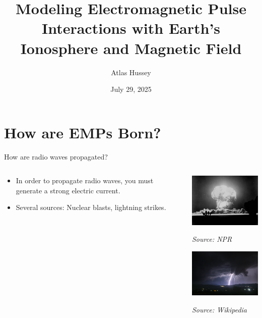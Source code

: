\documentclass[10pt, aspectratio=168]{beamer}
\title [EMP Analysis]{Modeling Electromagnetic Pulse Interactions with Earth's Ionosphere and Magnetic Field}
\author{Atlas Hussey}
\institute[]{ Institute for Computing in Research \\ Santa Fe, NM}
\date[07/29/2025]
{July 29, 2025}
\begin{document}
\frame{\titlepage}

\section{How are EMPs Born?}

    \begin{frame}{How are radio waves propagated?}
    \begin{columns}
        \begin{column}{0.4\textwidth}
            \begin{itemize}
                \item \large{In order to propagate radio waves, you must generate a strong electric current. }
                \vspace{1cm}
                \item Several sources: Nuclear blasts, lightning strikes.
            \end{itemize}  
        \end{column}
        \begin{column}{0.4\textwidth}
             \includegraphics[width=5cm]{apple-2-nuke-test.jpg}
            \caption{\scriptsize{\textit{Source: NPR}}}
            \vspace{0.5cm}
             \includegraphics[width=5cm]{Rural_nightime_lightning_strike.png}
            \caption{\scriptsize{\textit{Source: Wikipedia}}}
        \end{column}
    \end{columns}
    \end{frame}
    
\end{document}
